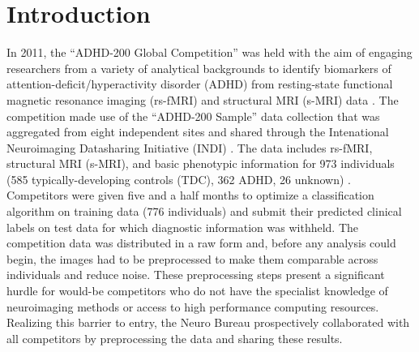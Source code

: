 \documentclass[preprint,12pt,3p]{elsarticle}
\begin{document}

\section{Introduction}

In 2011, the ``ADHD-200 Global Competition'' was held with the aim of engaging researchers from a variety of analytical backgrounds to identify biomarkers of attention-deficit/hyperactivity disorder (ADHD) from resting-state functional magnetic resonance imaging (rs-fMRI) and structural MRI (s-MRI) data \cite{Milham2012}. The competition made use of the ``ADHD-200 Sample'' data collection that was aggregated from eight independent sites and shared through the Intenational Neuroimaging Datasharing Initiative (INDI) \cite{Mennes2013}. The data includes rs-fMRI, structural MRI (s-MRI), and basic phenotypic information for 973 individuals (585 typically-developing controls (TDC), 362 ADHD, 26 unknown) \cite{Milham2012}. Competitors were given five and a half months to optimize a classification algorithm on training data (776 individuals) and submit their predicted clinical labels on test data for which diagnostic information was withheld. The competition data was distributed in a raw form and, before any analysis could begin, the images had to be preprocessed to make them comparable across individuals and reduce noise. These preprocessing steps present a significant hurdle for would-be competitors who do not have the specialist knowledge of neuroimaging methods or access to high performance computing resources. Realizing this barrier to entry, the Neuro Bureau prospectively collaborated with all competitors by preprocessing the data and sharing these results.
\end{document}
